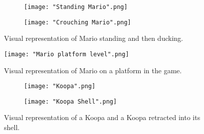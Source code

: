 \documentclass[12pt, titlepage]{article}
\begin{document}
\begin{figure}[!h]
    \begin{subfigure}{0.25\textwidth}
        \texttt{[image: "Standing Mario".png]}
    \end{subfigure}
    \hfill
    \begin{subfigure}{0.25\textwidth}
        \texttt{[image: "Crouching Mario".png]}
    \end{subfigure}
    \caption{Visual representation of Mario standing and then ducking.}
\end{figure}

\begin{figure}[!h]
    \centering
    \texttt{[image: "Mario platform level".png]}
    \caption{Visual representation of Mario on a platform in the game.}
\end{figure}

\begin{figure}[!h]
    \begin{subfigure}{0.25\textwidth}
        \texttt{[image: "Koopa".png]}
    \end{subfigure}
    \hfill
    \begin{subfigure}{0.25\textwidth}
        \texttt{[image: "Koopa Shell".png]}
    \end{subfigure}
    \caption{Visual representation of a Koopa and a Koopa retracted into its shell.}
\end{figure}
\end{document}
